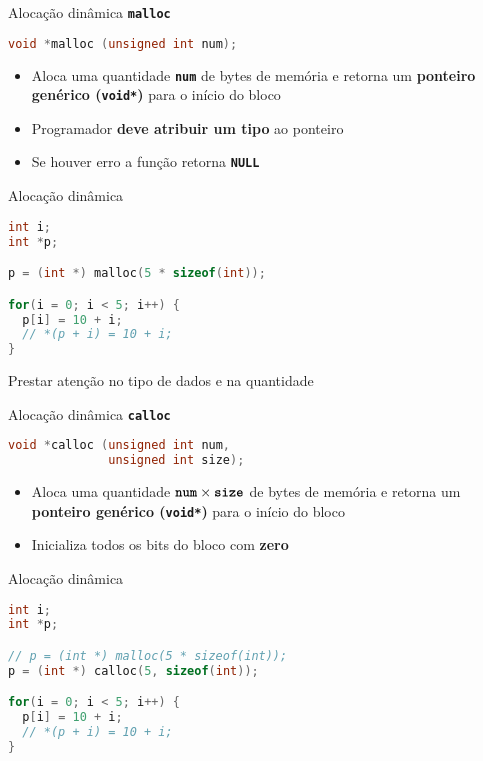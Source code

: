 \documentclass[10pt]{beamer}
\begin{document}
\begin{frame}[fragile]{Alocação dinâmica}
  \huge
  \textbf{\texttt{malloc}}
  \vfill
  \Large
  \begin{lstlisting}[language=C]
void *malloc (unsigned int num);
  \end{lstlisting}
  \vfill
  \large
  \setlength{\leftmargini}{0pt}
  \begin{itemize}
      \item [] Aloca uma quantidade \textbf{\texttt{num}} de bytes de memória e retorna um \textbf{ponteiro genérico (\texttt{void*})} para o início do bloco
      \item [] Programador \textbf{deve atribuir um tipo} ao ponteiro
      \item [] Se houver erro a função retorna \textbf{\texttt{NULL}}
  \end{itemize}
\end{frame}

\begin{frame}[fragile]{Alocação dinâmica}
  \large
  \begin{lstlisting}[language=C]
int i;
int *p;

p = (int *) malloc(5 * sizeof(int));

for(i = 0; i < 5; i++) {
  p[i] = 10 + i;
  // *(p + i) = 10 + i;
}
  \end{lstlisting}
  \vfill
  \large
  \faExclamationTriangle \quad Prestar atenção no tipo de dados e na quantidade
\end{frame}

\begin{frame}[fragile]{Alocação dinâmica}
  \huge
  \textbf{\texttt{calloc}}
  \vfill
  \Large
  \begin{lstlisting}[language=C]
void *calloc (unsigned int num,
              unsigned int size);
  \end{lstlisting}
  \vfill
  \large
  \setlength{\leftmargini}{0pt}
  \begin{itemize}
      \item [] Aloca uma quantidade $\textnormal{\textbf{\texttt{num}}} \times \textnormal{\textbf{\texttt{size}}}$ de bytes de memória e retorna um \textbf{ponteiro genérico (\texttt{void*})} para o início do bloco
      \item [] Inicializa todos os bits do bloco com \textbf{zero}
  \end{itemize}
\end{frame}

\begin{frame}[fragile]{Alocação dinâmica}
  \large
  \begin{lstlisting}[language=C]
int i;
int *p;

// p = (int *) malloc(5 * sizeof(int));
p = (int *) calloc(5, sizeof(int));

for(i = 0; i < 5; i++) {
  p[i] = 10 + i;
  // *(p + i) = 10 + i;
}
  \end{lstlisting}
\end{frame}
\end{document}
